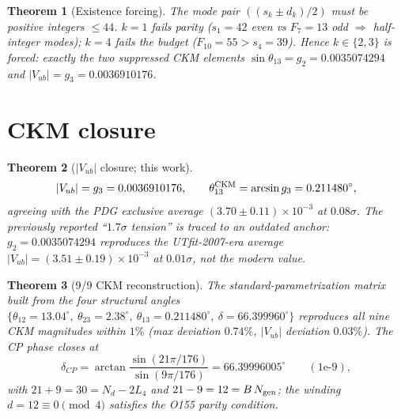 \documentclass[12pt]{article}
\newtheorem{theorem}{Theorem}
\begin{document}
\begin{theorem}[Existence forcing]
\label{thm:existence}
The mode pair $((s_k\pm d_k)/2)$ must be positive integers $\le 44$.
$k=1$ fails parity ($s_1=42$ even vs $F_7=13$ odd $\Rightarrow$ half-integer
modes); $k=4$ fails the budget ($F_{10}=55 > s_4=39$). Hence
$k\in\{2,3\}$ is \emph{forced}: exactly the two suppressed CKM elements
$\sin\theta_{13}=g_2=0.0035074294$ and $|V_{ub}|=g_3=0.0036910176$.
\end{theorem}

\section{CKM closure}
\label{sec:ckm}
\begin{theorem}[$|V_{ub}|$ closure; this work]
\label{thm:vub}
\begin{equation}
\label{eq:vub}
|V_{ub}| = g_3 = 0.0036910176, \qquad
\theta_{13}^{\rm CKM} = \arcsin g_3 = 0.211480^\circ,
\end{equation}
agreeing with the PDG exclusive average $(3.70\pm0.11)\times10^{-3}$ at
$0.08\sigma$. The previously reported ``$1.7\sigma$ tension'' is traced to
an outdated anchor: $g_2 = 0.0035074294$ reproduces the
UTfit-2007-era average $|V_{ub}|=(3.51\pm0.19)\times10^{-3}$ at $0.01\sigma$,
not the modern value.
\end{theorem}

\begin{theorem}[9/9 CKM reconstruction]
\label{thm:ckm9}
The standard-parametrization matrix built from the four structural angles
$\{\theta_{12}{=}13.04^\circ,\ \theta_{23}{=}2.38^\circ,\
\theta_{13}{=}0.211480^\circ,\ \delta{=}66.399960^\circ\}$ reproduces all
nine CKM magnitudes within $1\%$ (max deviation $0.74\%$, $|V_{ub}|$
deviation $0.03\%$). The CP phase closes at
\begin{equation}
\label{eq:delta}
\delta_{CP} = \arctan\frac{\sin(21\pi/176)}{\sin(9\pi/176)}
= 66.39996005^\circ \qquad (1\text{e-}9),
\end{equation}
with $21+9 = 30 = N_d - 2L_4$ and $21-9 = 12 = B\,N_{\rm gen}$; the winding
$d=12 \equiv 0 \pmod 4$ satisfies the O155 parity condition.
\end{theorem}
\end{document}
